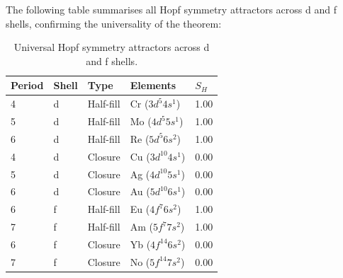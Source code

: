 \documentclass[aps,prl,onecolumn,superscriptaddress]{revtex4-2}
\begin{document}
The following table summarises all Hopf symmetry attractors
across d and f shells, confirming the universality of the theorem:

\begin{table}[h]
\centering
\caption{Universal Hopf symmetry attractors across d and f shells.}
\begin{tabular}{lllll}
\toprule
Period & Shell & Type & Elements & $S_H$ \\
\midrule
4 & d & Half-fill & Cr ($3d^5 4s^1$) & 1.00 \\
5 & d & Half-fill & Mo ($4d^5 5s^1$) & 1.00 \\
6 & d & Half-fill & Re ($5d^5 6s^2$) & 1.00 \\
4 & d & Closure   & Cu ($3d^{10}4s^1$) & 0.00 \\
5 & d & Closure   & Ag ($4d^{10}5s^1$) & 0.00 \\
6 & d & Closure   & Au ($5d^{10}6s^1$) & 0.00 \\
6 & f & Half-fill & Eu ($4f^7 6s^2$) & 1.00 \\
7 & f & Half-fill & Am ($5f^7 7s^2$) & 1.00 \\
6 & f & Closure   & Yb ($4f^{14}6s^2$) & 0.00 \\
7 & f & Closure   & No ($5f^{14}7s^2$) & 0.00 \\
\bottomrule
\end{tabular}
\end{table}
\end{document}
